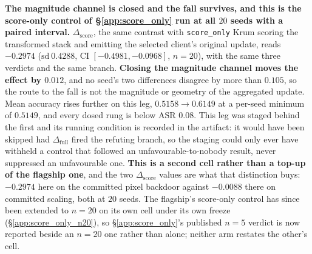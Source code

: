 \documentclass{article}
\begin{document}
\textbf{The magnitude channel is closed and the fall survives, and this is the score-only control of §\ref{app:score_only} run at all $20$ seeds with a paired interval.} $\Delta_{\mathrm{score}}$, the same contrast with \texttt{score\_only} Krum scoring the transformed stack and emitting the selected client's original update, reads $\mathbf{-0.2974}$ ($\mathrm{sd}\ 0.4288$, CI $[-0.4981, -0.0968]$, $n{=}20$), with the same three verdicts and the same branch. \textbf{Closing the magnitude channel moves the effect by $0.012$}, and no seed's two differences disagree by more than $0.105$, so the route to the fall is not the magnitude or geometry of the aggregated update. Mean accuracy rises further on this leg, $0.5158 \to 0.6149$ at a per-seed minimum of $0.5149$, and every dosed rung is below ASR $0.08$. This leg was staged behind the first and its running condition is recorded in the artifact: it would have been skipped had $\Delta_{\mathrm{full}}$ fired the refuting branch, so the staging could only ever have withheld a control that followed an unfavourable-to-nobody result, never suppressed an unfavourable one. \textbf{This is a second cell rather than a top-up of the flagship one}, and the two $\Delta_{\mathrm{score}}$ values are what that distinction buys: $-0.2974$ here on the committed pixel backdoor against $-0.0088$ there on committed scaling, both at $20$ seeds. The flagship's score-only control has since been extended to $n{=}20$ on its own cell under its own freeze (§\ref{app:score_only_n20}), so §\ref{app:score_only}'s published $n{=}5$ verdict is now reported beside an $n{=}20$ one rather than alone; neither arm restates the other's cell.
\end{document}
